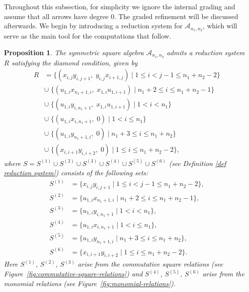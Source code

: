 \documentclass[a4paper, reqno, 11pt]{amsart}
\newtheorem{proposition}[theorem]{Proposition}
\theoremstyle{definition}
\begin{document}
Throughout this subsection, for simplicity we ignore the internal grading and assume that all arrows have degree \(0\). The graded refinement will be discussed afterwards. We begin by introducing a reduction system for $\mathcal{A}_{n_1,n_2}$, which will serve as the main tool for the computations that follow.

\begin{proposition}\label{reduction system}
	The symmetric square algebra $\mathcal{A}_{n_1,n_2}$ admits a reduction system $R$ satisfying the diamond condition, given by
	\allowdisplaybreaks
	\begin{align*}
		R &=\bigl\{(x_{i,j}y_{i,j+1},\; y_{i,j}x_{i+1,j}) \mid 
		1\leq i<j-1 \leq n_1+n_2-2 \bigr\} \\
		&\cup\; \bigl\{(u_{1,i}x_{n_1+1, i},\; x_{1,i}u_{1,i+1}) \mid 
		n_1+2 \le i \le n_1+n_2-1 \bigr\} \\
		&\cup\; \bigl\{(u_{1,i}y_{i, n_1+1},\; x_{1,i}u_{1,i+1}) \mid 
		1 < i < n_1 \bigr\} \\
		&\cup\; \bigl\{(u_{1,i}x_{i, n_1+1},\; 0) \mid 
		1< i \le n_1 \bigr\} \\
		&\cup\; \bigl\{(u_{1,i}y_{n_1+1, i},\; 0) \mid 
		n_1+3 \le i \le n_1+n_2 \bigr\}\\
		&\cup\; \bigl\{(x_{i,i+1}y_{i,i+2},\; 0) \mid 
		1 \le i \le n_1+n_2-2 \bigr\},
	\end{align*}
	where $S = S^{(1)} \cup S^{(2)} \cup S^{(3)} \cup S^{(4)} \cup S^{(5)} \cup S^{(6)}$ (see Definition \ref{def reduction system}) consists of the following sets:
	\allowdisplaybreaks
	\begin{align*}
		S^{(1)} &= \{x_{i,j}y_{i,j+1} \mid 1\leq i<j-1 \leq n_1+n_2-2 \}, \\
		S^{(2)} &= \{u_{1,i}x_{n_1+1, i} \mid n_1+2 \le i \le n_1+n_2-1 \}, \\
		S^{(3)} &= \{u_{1,i}y_{i, n_1+1} \mid 1 < i < n_1 \}, \\
		S^{(4)} &= \{u_{1,i}x_{i, n_1+1} \mid 1 < i \le n_1 \}, \\
		S^{(5)} &= \{u_{1,i}y_{n_1+1, i} \mid n_1+3 \le i \le n_1+n_2 \},\\
		S^{(6)} &= \{x_{i,i+1}y_{i,i+2} \mid 1 \le i \le n_1+n_2-2 \}.
	\end{align*}
	Here $S^{(1)}$, $S^{(2)}$, $S^{(3)}$ arise from the commutative square relations (see Figure~\ref{fig:commutative-square-relations}) and $S^{(4)}$, $S^{(5)}$, $S^{(6)}$ arise from the monomial relations (see Figure~\ref{fig:monomial-relations}).
\end{proposition}
\end{document}
